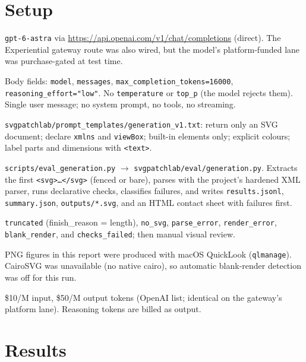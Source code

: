 \documentclass[11pt,a4paper]{article}
\begin{document}
\section{Setup}
\begingroup\sloppy
\begin{description}[style=nextline,leftmargin=2em]
  \item[Model] \texttt{gpt-6-astra} via \url{https://api.openai.com/v1/chat/completions} (direct). The Experiential gateway route was also wired, but the model's platform-funded lane was purchase-gated at test time.
  \item[Request] Body fields: \texttt{model}, \texttt{messages}, \texttt{max\_completion\_tokens=16000}, \texttt{reasoning\_effort="low"}. No \texttt{temperature} or \texttt{top\_p} (the model rejects them). Single user message; no system prompt, no tools, no streaming.
  \item[Prompt template] \texttt{svgpatchlab/prompt\_templates/generation\_v1.txt}: return only an SVG document; declare \texttt{xmlns} and \texttt{viewBox}; built-in elements only; explicit colours; label parts and dimensions with \texttt{<text>}.
  \item[Harness] \texttt{scripts/eval\_generation.py} $\rightarrow$ \texttt{svgpatchlab/eval/generation.py}. Extracts the first \texttt{<svg>\ldots</svg>} (fenced or bare), parses with the project's hardened XML parser, runs declarative checks, classifies failures, and writes \texttt{results.jsonl}, \texttt{summary.json}, \texttt{outputs/*.svg}, and an HTML contact sheet with failures first.
  \item[Failure taxonomy] \texttt{truncated} (finish\_reason = length), \texttt{no\_svg}, \texttt{parse\_error}, \texttt{render\_error}, \texttt{blank\_render}, and \texttt{checks\_failed}; then manual visual review.
  \item[Rendering] PNG figures in this report were produced with macOS QuickLook (\texttt{qlmanage}). CairoSVG was unavailable (no native cairo), so automatic blank-render detection was off for this run.
  \item[Pricing] \$10/M input, \$50/M output tokens (OpenAI list; identical on the gateway's platform lane). Reasoning tokens are billed as output.
\end{description}
\endgroup

\section{Results}
\end{document}
